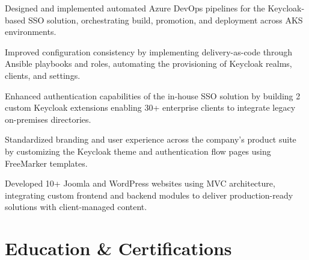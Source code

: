 \documentclass[11pt]{deedy-resume-openfont}
\begin{document}
\begin{tightemize}
	\item Designed and implemented automated Azure DevOps pipelines for the Keycloak-based SSO solution, orchestrating build, promotion, and deployment across AKS environments.
	\item Improved configuration consistency by implementing delivery-as-code through Ansible playbooks and roles, automating the provisioning of Keycloak realms, clients, and settings.
	\item Enhanced authentication capabilities of the in-house SSO solution by building 2 custom Keycloak extensions enabling 30+ enterprise clients to integrate legacy on-premises directories.
	\item Standardized branding and user experience across the company's product suite by customizing the Keycloak theme and authentication flow pages using FreeMarker templates.
\end{tightemize}
\sectionsep
{}
\sectionsep
{}\hfill {}
\begin{tightemize}
	\item Developed 10+ Joomla and WordPress websites using MVC architecture, integrating custom frontend and backend modules to deliver production-ready solutions with client-managed content.
\end{tightemize}
\sectionsep
{}
%
%
\vspace{0.8cm}
\section{Education \& Certifications}
\vspace{0.4cm}
\raggedright
{}\hfill {}\\
\sectionsep
{}\hfill {}\\
\sectionsep
{}\hfill {}\\
\sectionsep
{}\hfill {}\\
\sectionsep
%
%
\vspace{0.8cm}
\end{document}
